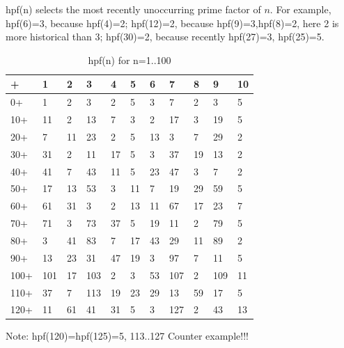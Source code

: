 \documentclass[12pt,a4paper,reqno]{amsart}
\numberwithin{equation}{section}
\theoremstyle{plain}
\theoremstyle{definition}
\begin{document}
	hpf(n) selects the most recently unoccurring prime factor of $n$. For example, 
	hpf(6)=3, because hpf(4)=2; hpf(12)=2, because hpf(9)=3,hpf(8)=2, here 2 is more 
	historical than 3; hpf(30)=2, because recently hpf(27)=3, hpf(25)=5. 
	
	\begin{table}[h!]
		\caption{hpf(n) for n=1..100}
		\label{table:1}
		\begin{tabular}{lllllllllll}
		+  & 1  & 2  & 3  & 4  & 5  & 6  & 7  & 8  & 9  & 10 \\
		\hline
		 0+ & 1  & 2  & 3  & 2  & 5  & 3  & 7  & 2  & 3  & 5 \\
		10+ & 11 & 2  & 13 & 7  & 3  & 2  & 17 & 3  & 19 & 5 \\
		20+ & 7  & 11 & 23 & 2  & 5  & 13 & 3  & 7  & 29 & 2 \\
		30+ & 31 & 2  & 11 & 17 & 5  & 3  & 37 & 19 & 13 & 2 \\
		40+ & 41 & 7  & 43 & 11 & 5  & 23 & 47 & 3  & 7  & 2 \\
		50+ & 17 & 13 & 53 & 3  & 11 & 7  & 19 & 29 & 59 & 5 \\
		60+ & 61 & 31 & 3  & 2  & 13 & 11 & 67 & 17 & 23 & 7 \\
		70+ & 71 & 3  & 73 & 37 & 5  & 19 & 11 & 2  & 79 & 5 \\
		80+ & 3  & 41 & 83 & 7  & 17 & 43 & 29 & 11 & 89 & 2 \\
		90+ & 13 & 23 & 31 & 47 & 19 & 3  & 97 & 7  & 11 & 5 \\
	   100+ & 101 & 17 & 103 & 2 & 3 & 53 & 107 & 2 & 109 & 11 \\
	   110+ & 37 & 7 & 113 & 19 & 23 & 29 & 13 & 59 & 17 & 5 \\
	   120+ & 11 & 61 & 41 & 31 & 5 & 3 & 127 & 2 & 43 & 13
		\end{tabular}
	\end{table}

	Note: hpf(120)=hpf(125)=5, 113..127 Counter example!!!
	
\end{document}
